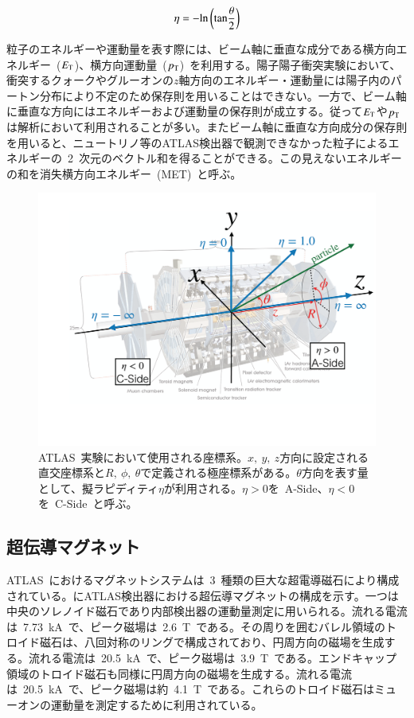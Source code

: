 \begin{align}
    \eta = -\rm{ln}\left(\rm{tan}\frac{\theta}{2}\right) \label{eq:eta}
\end{align}

粒子のエネルギーや運動量を表す際には、ビーム軸に垂直な成分である横方向エネルギー~($E_{\rm{T}}$)、横方向運動量~($p_{\rm{T}}$)~を利用する。陽子陽子衝突実験において、衝突するクォークやグルーオンの$z$軸方向のエネルギー・運動量には陽子内のパートン分布により不定のため保存則を用いることはできない。一方で、ビーム軸に垂直な方向にはエネルギーおよび運動量の保存則が成立する。従って$E_{\rm{T}}$や$p_{\rm{T}}$は解析において利用されることが多い。またビーム軸に垂直な方向成分の保存則を用いると、ニュートリノ等のATLAS検出器で観測できなかった粒子によるエネルギーの~2~次元のベクトル和を得ることができる。この見えないエネルギーの和を消失横方向エネルギー~(MET)~と呼ぶ。

\begin{figure}[tbp]
    \centering  
    \includegraphics[width=\textwidth,page=1]{img/pdf/cood.pdf}
    \caption[ATLAS~実験において使用される座標系]{ATLAS~実験において使用される座標系。$x,~y,~z$方向に設定される直交座標系と$R,~\phi,~\theta$で定義される極座標系がある。$\theta$方向を表す量として、擬ラピディティ$\eta$が利用される。$\eta>0$を~A-Side、$\eta<0$を~C-Side~と呼ぶ。}\label{fig:cood}
\end{figure}

\subsection{超伝導マグネット}
ATLAS~におけるマグネットシステムは~3~種類の巨大な超電導磁石により構成されている。にATLAS検出器における超伝導マグネットの構成を示す。一つは中央のソレノイド磁石であり内部検出器の運動量測定に用いられる。流れる電流は~7.73~kA~で、ピーク磁場は~2.6~T~である。その周りを囲むバレル領域のトロイド磁石は、八回対称のリングで構成されており、円周方向の磁場を生成する。流れる電流は~20.5~kA~で、ピーク磁場は~3.9~T~である。エンドキャップ領域のトロイド磁石も同様に円周方向の磁場を生成する。流れる電流は~20.5~kA~で、ピーク磁場は約~4.1~T~である。これらのトロイド磁石はミューオンの運動量を測定するために利用されている。

